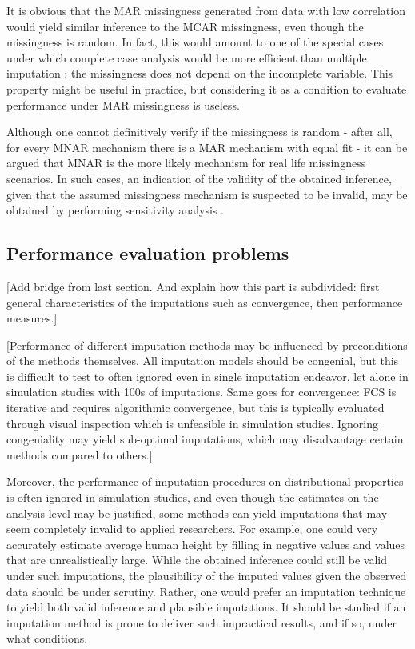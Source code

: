 \documentclass[bimj,fleqn]{w-art}
\theoremstyle{plain}
\theoremstyle{definition}
\begin{document}
It is obvious that the MAR missingness generated from data with low correlation would yield similar inference to the MCAR missingness, even though the missingness is random. In fact, this would amount to one of the special cases under which complete case analysis would be more efficient than multiple imputation \citep[see e.g.][p. 48]{fimd}: the missingness does not depend on the incomplete variable. This property might be useful in practice, but considering it as a condition to evaluate performance under MAR missingness is useless. 

Although one cannot definitively verify if the missingness is random - after all, for every MNAR mechanism there is a MAR mechanism with equal fit \citep{molenberghs2008every} - it can be argued that MNAR is the more likely mechanism for real life missingness scenarios. In such cases, an indication of the validity of the obtained inference, given that the assumed missingness mechanism is suspected to be invalid, may be obtained by performing sensitivity analysis \citep[see e.g.][part 5]{molenberghs2014handbook}.


\subsection{Performance evaluation problems}

[Add bridge from last section. And explain how this part is subdivided: first general characteristics of the imputations such as convergence, then performance measures.]

[Performance of different imputation methods may be influenced by preconditions of the methods themselves. All imputation models should be congenial, but this is difficult to test to often ignored even in single imputation endeavor, let alone in simulation studies with 100s of imputations. Same goes for convergence: FCS is iterative and requires algorithmic convergence, but this is typically evaluated through visual inspection which is unfeasible in simulation studies. Ignoring congeniality may yield sub-optimal imputations, which may disadvantage certain methods compared to others.]

Moreover, the performance of imputation procedures on distributional properties is often ignored in simulation studies, and even though the estimates on the analysis level may be justified, some methods can yield imputations that may seem completely invalid to applied researchers. For example, one could very accurately estimate average human height by filling in negative values and values that are unrealistically large. While the obtained inference could still be valid under such imputations, the plausibility of the imputed values given the observed data should be under scrutiny. Rather, one would prefer an imputation technique to yield both valid inference and plausible imputations. It should be studied if an imputation method is prone to deliver such impractical results, and if so, under what conditions.
\end{document}

